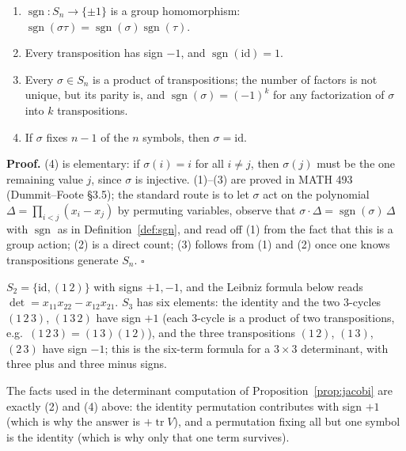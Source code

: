 \documentclass[11pt]{report}
\makeatletter
\newcounter{thmcounter}[section]
\newcounter{excounter}[section]
\renewenvironment{proof}[1][Proof]{\noindent\textbf{#1.} }{\hfill$\square$\par\vspace{5pt}}
\newcommand{\thmlabel}[1]{\edef\@currentlabel{\arabic{section}.\arabic{thmcounter}}\label{#1}}
\newcommand{\exlabel}[1]{\edef\@currentlabel{\arabic{section}.\arabic{excounter}}\label{#1}}
\DeclareMathOperator{\tr}{tr}
\DeclareMathOperator{\sgn}{sgn}
\newcommand{\leeref}[1]{\par\smallskip{\raggedleft\footnotesize\textsc{Lee}:\ #1\par}}
\makeatother
\begin{document}
\begin{propbox}\thmlabel{prop:sgn}
\begin{enumerate}
    \item $\sgn : S_n \to \{\pm 1\}$ is a group homomorphism: $\sgn(\sigma\tau) = \sgn(\sigma)\sgn(\tau)$.
    \item Every transposition has sign $-1$, and $\sgn(\mathrm{id}) = 1$.
    \item Every $\sigma \in S_n$ is a product of transpositions; the number of factors is not unique, but its parity is, and $\sgn(\sigma) = (-1)^k$ for any factorization of $\sigma$ into $k$ transpositions.
    \item If $\sigma$ fixes $n - 1$ of the $n$ symbols, then $\sigma = \mathrm{id}$.
\end{enumerate}
\leeref{App.~B, \emph{The Determinant}}
\end{propbox}

\begin{proof}
(4) is elementary: if $\sigma(i) = i$ for all $i \neq j$, then $\sigma(j)$ must be the one remaining value $j$, since $\sigma$ is injective. (1)--(3) are proved in MATH 493 (Dummit--Foote \S3.5); the standard route is to let $\sigma$ act on the polynomial $\Delta = \prod_{i<j}(x_i - x_j)$ by permuting variables, observe that $\sigma \cdot \Delta = \sgn(\sigma)\,\Delta$ with $\sgn$ as in Definition~\ref{def:sgn}, and read off (1) from the fact that this is a group action; (2) is a direct count; (3) follows from (1) and (2) once one knows transpositions generate $S_n$.
\end{proof}

\begin{exbox}\exlabel{ex:small-cases-two-three}
$S_2 = \{\mathrm{id}, (1\,2)\}$ with signs $+1, -1$, and the Leibniz formula below reads $\det = x_{11}x_{22} - x_{12}x_{21}$. $S_3$ has six elements: the identity and the two $3$-cycles $(1\,2\,3)$, $(1\,3\,2)$ have sign $+1$ (each $3$-cycle is a product of two transpositions, e.g.\ $(1\,2\,3) = (1\,3)(1\,2)$), and the three transpositions $(1\,2)$, $(1\,3)$, $(2\,3)$ have sign $-1$; this is the six-term formula for a $3 \times 3$ determinant, with three plus and three minus signs.
\end{exbox}

\begin{rembox}\label{rem:topgroups}
The facts used in the determinant computation of Proposition~\ref{prop:jacobi} are exactly (2) and (4) above: the identity permutation contributes with sign $+1$ (which is why the answer is $+\tr V$), and a permutation fixing all but one symbol is the identity (which is why only that one term survives).
\end{rembox}
\end{document}
